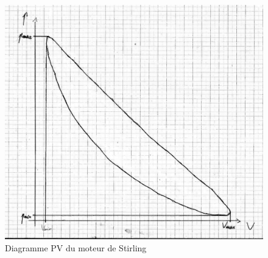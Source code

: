 \begin{figure}[h]
    \centering
    \includegraphics[width=\linewidth]{figures/scan_graph.png}
    \caption{Diagramme PV du moteur de Stirling}
    \label{fig:diag_pv}
\end{figure}

